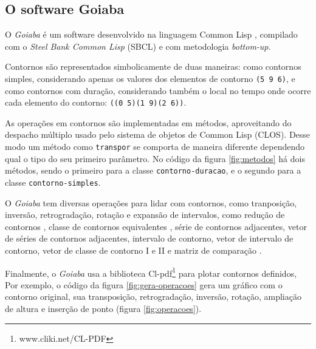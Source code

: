 \documentclass{sciposter}
\newcommand{\eng}[1]{\textit{#1}}
\newcommand{\goiaba}[1]{\textit{Goiaba}}
\newcommand{\code}[1]{\texttt{#1}}
\begin{document}
\begin{multicols}{3}
\section{O software Goiaba}

O \goiaba{} é um software desenvolvido na linguagem Common Lisp
\cite{graham94:lisp}, compilado com o \eng{Steel Bank Common Lisp}
(SBCL) \cite{team07:sbcl} e com metodologia
\eng{bottom-up}.

Contornos são representados simbolicamente de duas maneiras: como
contornos simples, considerando apenas os valores dos elementos de
contorno \code{(5 9 6)}, e como contornos com duração, considerando
também o local no tempo onde ocorre cada elemento do contorno:
\code{((0 5)(1 9)(2 6))}.

As operações em contornos são implementadas em métodos, aproveitando
do despacho múltiplo usado pelo sistema de objetos de Common Lisp
(CLOS). Desse modo um método como \texttt{transpor} se comporta de
maneira diferente dependendo qual o tipo do seu primeiro parâmetro. No
código da figura \ref{fig:metodos} há dois métodos, sendo o primeiro
para a classe \code{contorno-duracao}, e o segundo para a classe
\code{contorno-simples}.

O \goiaba{} tem diversas operações para lidar com contornos, como
tranposição, inversão, retrogradação, rotação e expansão de
intervalos, como redução de contornos \cite{adams76:melodic}, classe
de contornos equivalentes , série de contornos adjacentes, vetor de
séries de contornos adjacentes, intervalo de contorno, vetor de
intervalo de contorno, vetor de classe de contorno I e II
\cite{friedmann85:methodology} e matriz de comparação
\cite{morris93:directions}.

Finalmente, o \goiaba{} usa a biblioteca
Cl-pdf\footnote{www.cliki.net/CL-PDF} para plotar contornos definidos,
Por exemplo, o código da figura \ref{fig:gera-operacoes} gera um
gráfico com o contorno original, sua transposição, retrogradação,
inversão, rotação, ampliação de altura e inserção de ponto (figura
\ref{fig:operacoes}).

\end{multicols}
\end{document}
